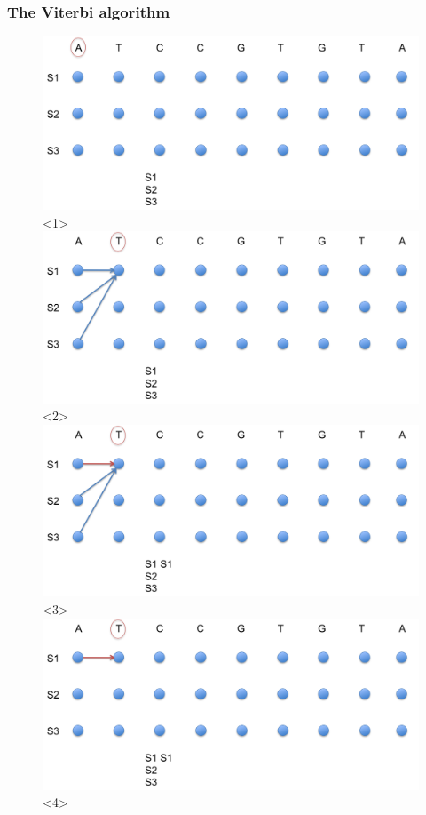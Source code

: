 \documentclass{beamer}
\begin{document}
\begin{frame}
\frametitle{The Viterbi algorithm}

		\begin{figure}[h]
			\centering
			\includegraphics[width=1.0\textwidth]{../picturesforthepresentation/Viterbi1.png}<1>
			\includegraphics[width=1.0\textwidth]{../picturesforthepresentation/Viterbi2.png}<2>
			\includegraphics[width=1.0\textwidth]{../picturesforthepresentation/Viterbi3.png}<3>
			\includegraphics[width=1.0\textwidth]{../picturesforthepresentation/Viterbi4.png}<4>

\end{figure}
\end{frame}
\end{document}
